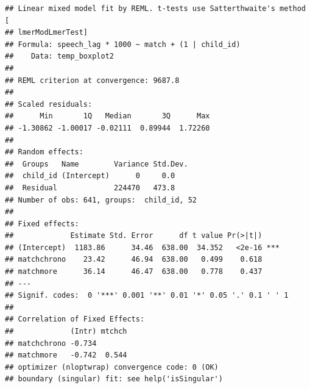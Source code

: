 \documentclass[
]{article}
\newenvironment{Shaded}{\begin{snugshade}}{\end{snugshade}}
\newcommand{\AttributeTok}[1]{\textcolor[rgb]{0.77,0.63,0.00}{#1}}
\newcommand{\CommentTok}[1]{\textcolor[rgb]{0.56,0.35,0.01}{\textit{#1}}}
\newcommand{\DecValTok}[1]{\textcolor[rgb]{0.00,0.00,0.81}{#1}}
\newcommand{\FunctionTok}[1]{\textcolor[rgb]{0.00,0.00,0.00}{#1}}
\newcommand{\NormalTok}[1]{#1}
\newcommand{\OtherTok}[1]{\textcolor[rgb]{0.56,0.35,0.01}{#1}}
\newcommand{\SpecialCharTok}[1]{\textcolor[rgb]{0.00,0.00,0.00}{#1}}
\newcommand{\StringTok}[1]{\textcolor[rgb]{0.31,0.60,0.02}{#1}}
\begin{document}
\begin{verbatim}
## Linear mixed model fit by REML. t-tests use Satterthwaite's method [
## lmerModLmerTest]
## Formula: speech_lag * 1000 ~ match + (1 | child_id)
##    Data: temp_boxplot2
## 
## REML criterion at convergence: 9687.8
## 
## Scaled residuals: 
##      Min       1Q   Median       3Q      Max 
## -1.30862 -1.00017 -0.02111  0.89944  1.72260 
## 
## Random effects:
##  Groups   Name        Variance Std.Dev.
##  child_id (Intercept)      0     0.0   
##  Residual             224470   473.8   
## Number of obs: 641, groups:  child_id, 52
## 
## Fixed effects:
##             Estimate Std. Error      df t value Pr(>|t|)    
## (Intercept)  1183.86      34.46  638.00  34.352   <2e-16 ***
## matchchrono    23.42      46.94  638.00   0.499    0.618    
## matchmore      36.14      46.47  638.00   0.778    0.437    
## ---
## Signif. codes:  0 '***' 0.001 '**' 0.01 '*' 0.05 '.' 0.1 ' ' 1
## 
## Correlation of Fixed Effects:
##             (Intr) mtchch
## matchchrono -0.734       
## matchmore   -0.742  0.544
## optimizer (nloptwrap) convergence code: 0 (OK)
## boundary (singular) fit: see help('isSingular')
\end{verbatim}

\begin{Shaded}
\end{Shaded}
\end{document}
